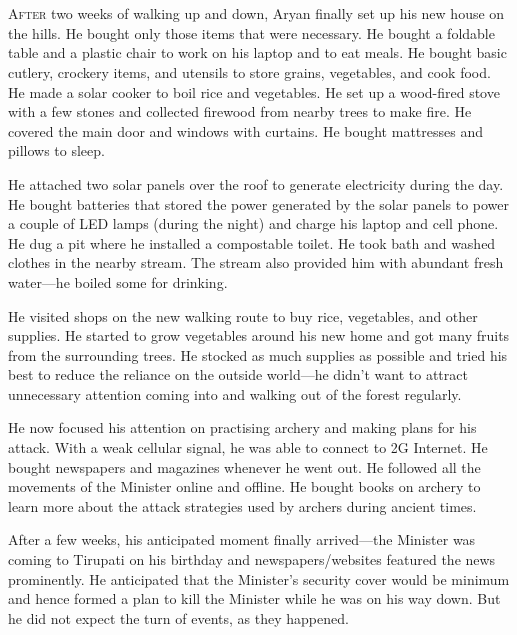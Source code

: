 \chapter{}

\lettrine{A}{fter} two weeks of walking up and down, Aryan finally set up his new house on
the hills. He bought only those items that were necessary. He bought a foldable
table and a plastic chair to work on his laptop and to eat meals. He bought
basic cutlery, crockery items, and utensils to store grains, vegetables, and
cook food. He made a solar cooker to boil rice and vegetables. He set up a
wood-fired stove with a few stones and collected firewood from nearby trees to
make fire. He covered the main door and windows with curtains. He bought
mattresses and pillows to sleep.

He attached two solar panels over the roof to generate electricity during the
day. He bought batteries that stored the power generated by the solar panels to
power a couple of LED lamps (during the night) and charge his laptop and cell
phone. He dug a pit where he installed a compostable toilet. He took bath and
washed clothes in the nearby stream. The stream also provided him with abundant
fresh water—he boiled some for drinking.

He visited shops on the new walking route to buy rice, vegetables, and other
supplies. He started to grow vegetables around his new home and got many fruits
from the surrounding trees. He stocked as much supplies as possible and tried his
best to reduce the reliance on the outside world—he didn't want to attract
unnecessary attention coming into and walking out of the forest regularly.

He now focused his attention on practising archery and making plans for his
attack. With a weak cellular signal, he was able to connect to 2G Internet. He
bought newspapers and magazines whenever he went out. He followed all the
movements of the Minister online and offline. He bought books on archery to
learn more about the attack strategies used by archers during ancient times.

After a few weeks, his anticipated moment finally arrived—the Minister was
coming to Tirupati on his birthday and newspapers/websites featured the news
prominently. He anticipated that the Minister's security cover would be minimum
and hence formed a plan to kill the Minister while he was on his way down. But
he did not expect the turn of events, as they happened.